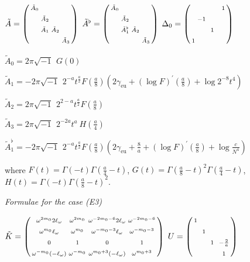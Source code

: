 \documentclass[a4paper,12pt,leqno]{amsart}
\numberwithin{equation}{section}
\theoremstyle{plain}
\theoremstyle{definition}
\newcommand{\De}{\Delta}
\newcommand{\om}{\omega}
\newcommand{\Ga}{\Gamma}
\newcommand{\no}{\noindent}
\newcommand{\pr}{\prime}
\newcommand{\bsp}{\left(\begin{smallmatrix}}
\newcommand{\esp}{\end{smallmatrix}\right)}
\newcommand{\ii}{ {\scriptstyle\sqrt{-1}}\, }
\newcommand{\nn}{m}
\newcommand{\eo}{\ell_\om}
\newcommand{\euler}{\gamma_{\scriptscriptstyle\text{eu}}}
\begin{document}
{$
\tilde A=
\bsp
\vphantom\sph
\tilde A_0 & & & 
\\
\vphantom\sph
 & \tilde A_2 & & 
\\
\vphantom\sph
 & \tilde A_1  & \tilde A_2   & 
 \\
 \vphantom\sph
 & & & \tilde A_3 
\esp
$
\quad
$
\tilde A^\flat=
\bsp
\vphantom\sph
\tilde A_0 & & & 
\\
\vphantom\sph
 & \tilde A_2 & & 
\\
\vphantom\sph
 & \tilde A^\flat_1  & \tilde A_2   & 
 \\
 \vphantom\sph
 & & & \tilde A_3 
\esp
$
\quad
$
\De_0=
\bsp 
\vphantom\sph
 & & & \ 1\\
 \vphantom\sph
  & -1 &  & \\
  \vphantom\sph
   &  & \ 1\  & \\
   \vphantom\sph
   1 & & &
\esp
$

$\tilde A_0 =2\pi\ii \ G(0)$

$\tilde A_1 =-2\pi\ii \ 2^{-a} t^{\frac a2} F(\tfrac a8) \left(
2\euler  +  (\log F)^\pr(\tfrac a8) +    \log 2^{-8}t^4  
\right)$

$\tilde A_2 =2\pi\ii \ 2^{2-a} t^{\frac a2} F(\tfrac a8)$

$\tilde A_3 = 2\pi\ii \ 2^{-2a} t^a \ H(\tfrac a4)$

\smallskip

$\tilde A^\flat_1 =-2\pi\ii \ 2^{-a} t^{\frac a2} F(\tfrac a8) \left(
2\euler  + \tfrac 8a + (\log F)^\pr(\tfrac a8) +    \log \tfrac{c}{N^4} 
\right)$

\no where 
$F(t)=\Ga(-t)\Ga(\tfrac a4-t)$, 
$G(t)=\Ga(\tfrac {a}8 - t)^2\Ga(\tfrac {a}4 - t)$,
$H(t)=\Ga(-t)\Ga(\tfrac {a}8 - t)^2$.


\begin{center}
{\em Formulae for the case (E3)}
\end{center}

$
\tilde K=
\bsp
\vphantom\sph
\om^{2\nn_0}2\eo & \om^{2\nn_0} & \om^{-2\nn_0-6}2\eo & \om^{-2\nn_0-6}
\\
\vphantom\sph
\om^{\nn_0}\eo & \om^{\nn_0} & \om^{-\nn_0-3}\eo & \om^{-\nn_0-3}
\\
\vphantom\sph
0 & 1 & 0 & 1
\\
\vphantom\sph
\om^{-\nn_0}(-\eo) & \om^{-\nn_0} & \om^{\nn_0+3}(-\eo) & \om^{\nn_0+3}
\esp
$
\quad
$
U=\bsp
\vphantom\sph
1\  & & &
\\
\vphantom\sph
 & 1 &  &
\\
\vphantom\sph
 & & \ 1\  & -\frac2a
\\
\vphantom\sph
 & & & 1
\esp
$

}
\end{document}
